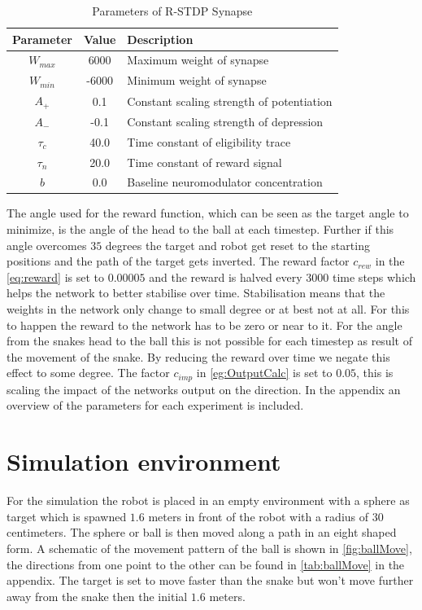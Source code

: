 \begin{table}[htpb]
  \caption[Parameters R-STDP synapse]{Parameters of R-STDP Synapse} \label{tab:baseRstdp}
  \centering
  \begin{tabular}{|c| c |l|}
      \toprule
      Parameter & Value & Description \\
      \midrule
      $W_{max}$ & 6000   & Maximum weight of synapse\\   
      $W_{min}$ & -6000  & Minimum weight of synapse\\   
      $A_{+}$   & 0.1    & Constant scaling strength of potentiation\\   
      $A_{-}$   & -0.1   & Constant scaling strength of depression \\   
      $\tau_c$  & 40.0   & Time constant of eligibility trace \\  
      $\tau_n$  & 20.0   & Time constant of reward signal  \\   
      $b$       & 0.0    & Baseline neuromodulator concentration \\    
      \bottomrule
  \end{tabular}
  \end{table}

The angle used for the reward function, which can be seen as the target angle to minimize, is the angle of the head to the ball at each timestep. Further if this angle overcomes $35$ degrees the target and robot get reset to the starting positions and the path of the target gets inverted.
The reward factor $c_{rew}$ in the \autoref{eq:reward} is set to $0.00005$ and the reward is halved every $3000$ time steps which helps the network to better stabilise over time. Stabilisation means that the weights in the network only change to small degree or at best not at all. For this to happen the reward to the network has to be zero or near to it. For the angle from the snakes head to the ball this is not possible for each timestep as result of the movement of the snake. By reducing the reward over time we negate this effect to some degree. The factor $c_{imp}$ in \autoref{eg:OutputCalc} is set to $0.05$, this is scaling the impact of the networks output on the direction. In the appendix an overview of the parameters for each experiment is included.  

\section{Simulation environment}
For the simulation the robot is placed in an empty environment with a sphere as target which is spawned $1.6$ meters in front of the robot with a radius of $30$ centimeters. The sphere or ball is then moved along a path in an eight shaped form. A schematic of the movement pattern of the ball is shown in \autoref{fig:ballMove}, the directions from one point to the other can be found in \autoref{tab:ballMove} in the appendix.
The target is set to move faster than the snake but won’t move further away from the snake then the initial $1.6$ meters.


